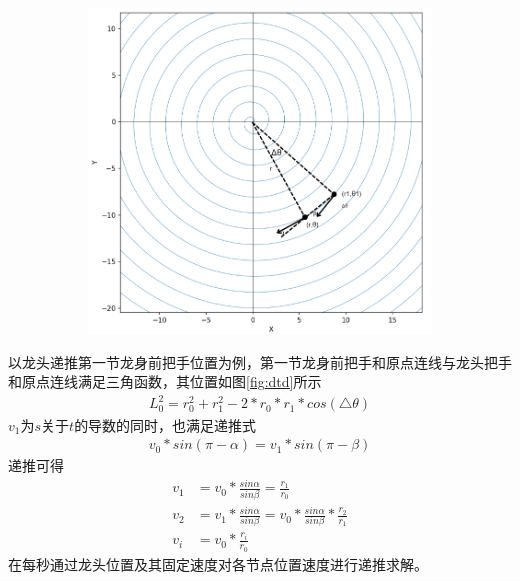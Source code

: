 \documentclass[withoutpreface,bwprint]{cumcmthesis}
\begin{document}
\begin{figure}[htbp!]
\begin{subfigure}[t]{0.45\textwidth}
		\includegraphics[width=\textwidth]{pics/dtv}
		\label{fig:dtv}
	\end{subfigure}
\end{figure}
以龙头递推第一节龙身前把手位置为例，第一节龙身前把手和原点连线与龙头把手和原点连线满足三角函数，其位置如图\ref{fig:dtd}所示
\begin{align*}
	L_0^2 = r_0^2 +r_1^2 - 2*r_0*r_1*cos(\triangle\theta)
\end{align*}
$v_1$为$s$关于$t$的导数的同时，也满足递推式
\begin{align*}
	v_0*sin(\pi-\alpha) = v_1*sin(\pi-\beta)
\end{align*}
递推可得
\begin{align*}
	v_1 &= v_0*\frac{sin\alpha}{sin\beta}=\frac{r_1}{r_0}\\
	v_2 &= v_1*\frac{sin\alpha}{sin\beta}= v_0*\frac{sin\alpha}{sin\beta}*\frac{r_2}{r_1}\\
v_i&= v_0*\frac{r_i}{r_0}
\end{align*}
在每秒通过龙头位置及其固定速度对各节点位置速度进行递推求解。
\end{document}
